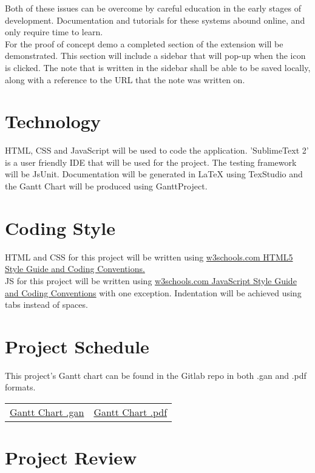\documentclass{article}
\begin{document}
	Both of these issues can be overcome by careful education in the early 
	stages of development. Documentation and tutorials for these systems abound 
	online, and only require time to learn.\\
	
	For the proof of concept demo a completed section of the extension will be 
	demonstrated. This section will include a sidebar that will pop-up when the icon is 
	clicked. The note that is written in the sidebar shall be able to be saved locally, along 
	with a reference to the URL that the note was written on. 
	\section{Technology}
	
	HTML, CSS and JavaScript will be used to code the application. 'SublimeText 
	2' is a user 
	friendly
	IDE that will be used for the project. The testing framework will be 
	JsUnit. 
	Documentation will be generated in LaTeX using TexStudio and 
	the Gantt Chart will be produced using GanttProject.
	
	\section{Coding Style}
	
	HTML and CSS for this project will be written using 
	\href{http://www.w3schools.com/html/html5_syntax.asp}
	{w3schools.com HTML5 Style Guide and Coding Conventions.}\\
	
	JS for this project will be written using 
	\href{http://www.w3schools.com/js/js_conventions.asp}
	{w3schools.com JavaScript Style Guide and Coding Conventions} with one 
	exception. Indentation will be achieved using tabs instead of spaces.
	
	\section{Project Schedule}
	 This project's Gantt chart can be found in the Gitlab repo in both .gan 
	 and .pdf formats.
		\begin{table}[H]
			\begin{tabularx}{\textwidth}{cc}		
				\href{https://gitlab.cas.mcmaster.ca/macsidenotes/macsidenotes/blob/master/ProjectSchedule/MacSidenotesProjectSchedule.gan}
				{Gantt Chart .gan} & 
				\href{https://gitlab.cas.mcmaster.ca/macsidenotes/macsidenotes/blob/master/ProjectSchedule/MacSidenotesProjectSchedule.pdf}
				{Gantt Chart .pdf}
			\end{tabularx}
		\end{table}
	
	\section{Project Review}
	
\end{document}
